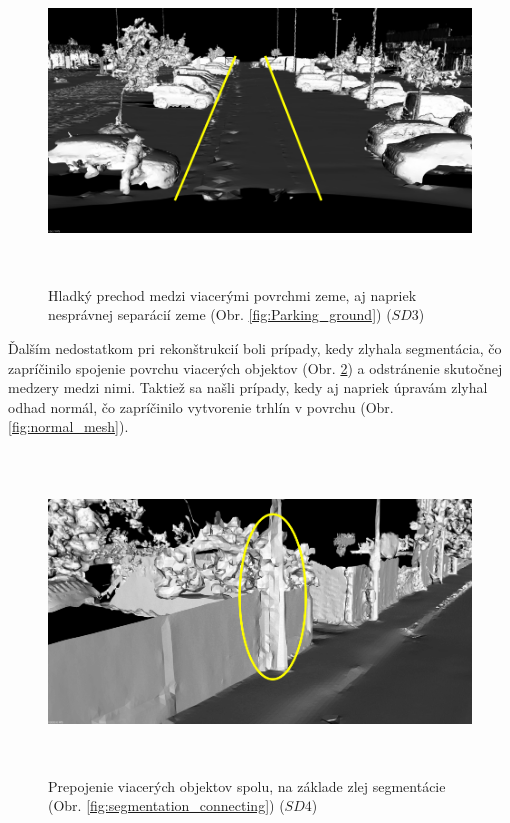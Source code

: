 \newpage\vfill
\begin{figure}[!htbp]
  \centering
  \includegraphics[width=16cm, height=8.5cm]{img/ground_separation_mesh.png}
  \caption{Hladký prechod medzi viacerými povrchmi zeme, aj napriek nesprávnej separácií zeme (Obr. \ref{fig:Parking_ground}) ($SD3$)} 
  \label{fig:ground_separation_mesh}
\end{figure} 

\indent Ďalším nedostatkom pri rekonštrukcií boli prípady, kedy zlyhala segmentácia, čo zapríčinilo spojenie povrchu viacerých objektov (Obr. \ref{fig:connecting_mesh}) a odstránenie skutočnej medzery medzi nimi. Taktiež sa našli prípady, kedy aj napriek úpravám zlyhal odhad normál, čo zapríčinilo vytvorenie trhlín v povrchu (Obr. \ref{fig:normal_mesh}).

\vfill
\begin{figure}[!htbp]
  \centering
  \includegraphics[width=16cm, height=8.5cm]{img/connecting_mesh.png}
  \caption{Prepojenie viacerých objektov spolu, na základe zlej segmentácie (Obr. \ref{fig:segmentation_connecting}) ($SD4$)} 
  \label{fig:connecting_mesh}
\end{figure} 

